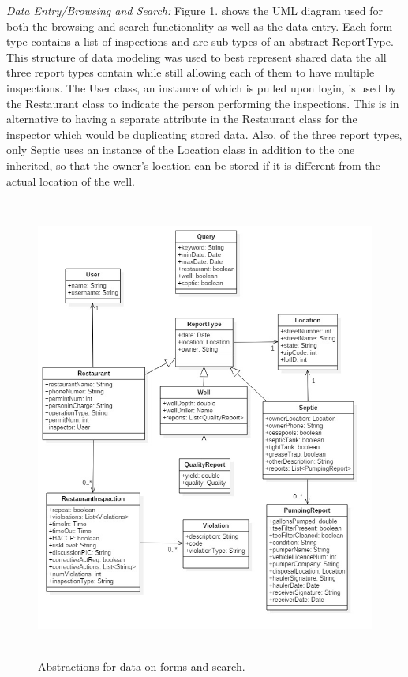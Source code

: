 \documentclass[twoside,letterpaper]{article}
\begin{document}
\noindent\textit{Data Entry/Browsing and Search:}\newline
Figure 1. shows the UML diagram used for both the browsing and search functionality as well as the data entry. Each form type contains a list of inspections and are sub-types of an abstract ReportType. This structure of data modeling was used to best represent shared data the all three report types contain while still allowing each of them to have multiple inspections. The User class, an instance of which is pulled upon login, is used by the Restaurant class to indicate the person performing the inspections. This is in alternative to having a separate attribute in the Restaurant class for the inspector which would be duplicating stored data. Also, of the three report types, only Septic uses an instance of the Location class in addition to the one inherited, so that the owner's location can be stored if it is different from the actual location of the well.
\begin{figure}[H]
\centering
\includegraphics[width=6in,height=6in]{Browsing_and_Search_UML.jpg}
\caption{Abstractions for data on forms and search.}
\end{figure}
\end{document}
